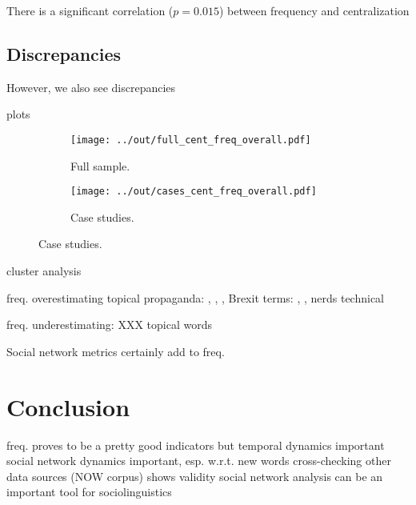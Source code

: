 \documentclass[a4paper, abstract=on]{scrartcl}
\begin{document}
    There is a significant correlation ($p = 0.015$) between frequency and centralization

  \subsection{Discrepancies}

    However, we also see discrepancies

      plots

        \begin{figure}[H]
          \centering
          \begin{subfigure}{.45\linewidth}
            \caption{Full sample.}
            \centering
            \texttt{[image: ../out/full\_cent\_freq\_overall.pdf]}
          \end{subfigure}
          \begin{subfigure}{.45\linewidth}
            \caption{Case studies.}
            \centering
            \texttt{[image: ../out/cases\_cent\_freq\_overall.pdf]}
          \end{subfigure}
        \end{figure}

      cluster analysis

        freq. overestimating
          topical
          propaganda: , , , 
          Brexit terms: , , 
          nerds
          technical

        freq. underestimating: XXX
          topical words

    Social network metrics certainly add to freq.

\section{Conclusion}

  freq. proves to be a pretty good indicators
  but
    temporal dynamics important
    social network dynamics important, esp. w.r.t. new words
      cross-checking other data sources (NOW corpus) shows validity
  social network analysis can be an important tool for sociolinguistics


  \printbibliography
\end{document}
